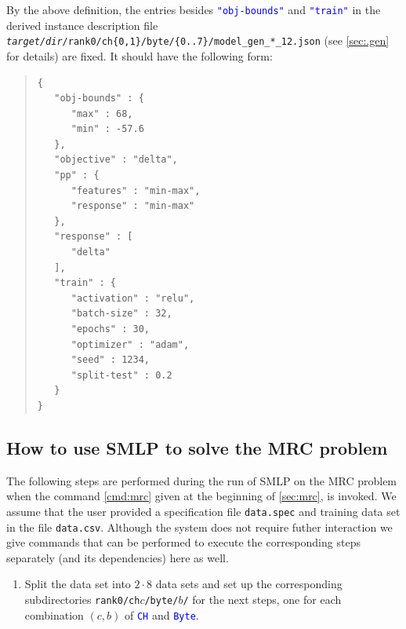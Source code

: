 \documentclass[a4paper,parskip=half]{article} %
\newcommand*\cmdstyle\texttt
\newcommand*\file\cmdstyle
\newcommand*\literalColor{blue}
\newcommand*\literal[1]{\textcolor{\literalColor}{\cmdstyle{#1}}}
\newcommand*\Solver{Symbolic Machine Learning Prover\xspace}
\newcommand*\SolverAbbrvText{SMLP}
\newcommand*\SolverAbbrv{\SolverAbbrvText\xspace}
\begin{document}
{By the above definition, the entries besides
\literal{"obj-bounds"} and \literal{"train"}
in the derived instance description file
\file{\emph{target/dir}/rank0/ch\{0,1\}/byte/\{0..7\}/model\_gen\_*\_12.json}
(see \cref{sec:.gen} for details) are fixed.
It should have the following form:
\begin{quote}\footnotesize\color{\literalColor}\begin{verbatim}
{
   "obj-bounds" : {
      "max" : 68,
      "min" : -57.6
   },
   "objective" : "delta",
   "pp" : {
      "features" : "min-max",
      "response" : "min-max"
   },
   "response" : [
      "delta"
   ],
   "train" : {
      "activation" : "relu",
      "batch-size" : 32,
      "epochs" : 30,
      "optimizer" : "adam",
      "seed" : 1234,
      "split-test" : 0.2
   }
}
\end{verbatim}\end{quote}


\subsection{How to use \SolverAbbrv to solve the MRC problem}

The following steps are performed during the run of \SolverAbbrv on the MRC
problem when the command \eqref{cmd:mrc}  given at the beginning of
\cref{sec:mrc}, is invoked. We assume that the user provided a specification
file \file{data.spec} and training data set in the file \file{data.csv}.
Although the system does not require futher interaction we give commands that
can be performed to execute the corresponding steps separately  (and its
dependencies) here as well.

\begin{enumerate}
\item\label{step:shai:2}
	Split the data set into $2\cdot8$ data sets and set up the corresponding
	subdirectories \file{rank0/ch$c$/byte/$b$/} for the next steps,
	one for each combination $(c,b)$ of \literal{CH} and \literal{Byte}.


\end{enumerate}}
\end{document}
